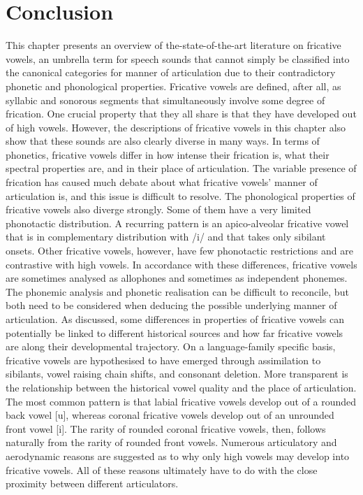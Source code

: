 \documentclass[output=paper,colorlinks,citecolor=brown,chinesefont]{langscibook}
\begin{document}
\section{Conclusion}
This chapter presents an overview of the-state-of-the-art literature on fricative vowels, an umbrella term for speech sounds that cannot simply be classified into the canonical categories for manner of articulation due to their contradictory phonetic and phonological properties. Fricative vowels are defined, after all, as syllabic and sonorous segments that simultaneously involve some degree of frication. One crucial property that they all share is that they have developed out of high vowels. However, the descriptions of fricative vowels in this chapter also show that these sounds are also clearly diverse in many ways. In terms of phonetics, fricative vowels differ in how intense their frication is, what their spectral properties are, and in their place of articulation. The variable presence of frication has caused much debate about what fricative vowels' manner of articulation is, and this issue is difficult to resolve. The phonological properties of fricative vowels also diverge strongly. Some of them have a very limited phonotactic distribution. A recurring pattern is an apico-alveolar fricative vowel that is in complementary distribution with /i/ and that takes only sibilant onsets. Other fricative vowels, however, have few phonotactic restrictions and are contrastive with high vowels. In accordance with these differences, fricative vowels are sometimes analysed as allophones and sometimes as independent phonemes. The phonemic analysis and phonetic realisation can be difficult to reconcile, but both need to be considered when deducing the possible underlying manner of articulation. As discussed, some differences in properties of fricative vowels can potentially be linked to different historical sources and how far fricative vowels are along their developmental trajectory. On a language-family specific basis, fricative vowels are hypothesised to have emerged through assimilation to sibilants, vowel raising chain shifts, and consonant deletion. More transparent is the relationship between the historical vowel quality and the place of articulation. The most common pattern is that labial fricative vowels develop out of a rounded back vowel [u], whereas coronal fricative vowels develop out of an unrounded front vowel [i]. The rarity of rounded coronal fricative vowels, then, follows naturally from the rarity of rounded front vowels. Numerous articulatory and aerodynamic reasons are suggested as to why only high vowels may develop into fricative vowels. All of these reasons ultimately have to do with the close proximity between different articulators.
\end{document}
